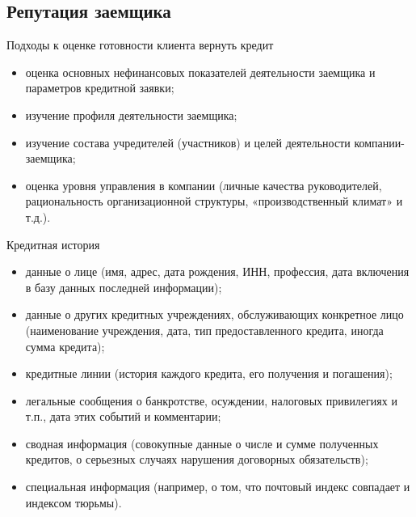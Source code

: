 \documentclass[_Banking_p2.tex]{subfiles}
\begin{document}
\subsection{Репутация заемщика}
\begin{frame}{Подходы к оценке готовности клиента вернуть кредит}{}
\begin{itemize}[<+->]
\item
оценка основных нефинансовых показателей деятельности заемщика и параметров кредитной заявки;
\item
изучение профиля деятельности заемщика;
\item
изучение состава учредителей (участников) и целей деятельности компании-заемщика;
\item
оценка уровня управления в компании (личные качества руководителей, рациональность организационной структуры,  «производственный климат» и т.д.).

\end{itemize}
\end{frame}
\begin{frame}[ allowframebreaks ]{Кредитная история}
\begin{itemize}
\item
данные о лице (имя, адрес, дата рождения, ИНН, профессия, дата включения в базу данных последней информации);
\item
данные о других кредитных учреждениях, обслуживающих конкретное лицо (наименование учреждения, дата, тип предоставленного кредита, иногда сумма кредита);
\item
кредитные линии (история каждого кредита, его получения и погашения);

\pagebreak
\item
легальные сообщения о банкротстве, осуждении, налоговых привилегиях и т.п., дата этих событий и комментарии;
\item
сводная информация (совокупные данные о числе и сумме полученных кредитов, о серьезных случаях нарушения договорных обязательств);
\item
специальная информация (например, о том, что почтовый индекс совпадает и индексом тюрьмы).
\end{itemize}

\end{frame}
\end{document}
